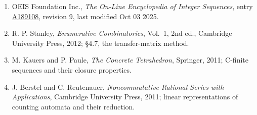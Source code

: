 \documentclass[11pt]{article}
\theoremstyle{definition}
\begin{document}
\begin{enumerate}

\item OEIS Foundation Inc., \emph{The On-Line Encyclopedia of Integer Sequences}, entry \href{https://oeis.org/A189108}{A189108}, revision 9, last modified Oct 03 2025.

\item R. P. Stanley, \emph{Enumerative Combinatorics}, Vol.~1, 2nd ed., Cambridge University Press, 2012; \S4.7, the transfer-matrix method.

\item M. Kauers and P. Paule, \emph{The Concrete Tetrahedron}, Springer, 2011; C-finite sequences and their closure properties.

\item J. Berstel and C. Reutenauer, \emph{Noncommutative Rational Series with Applications}, Cambridge University Press, 2011; linear representations of counting automata and their reduction.

\end{enumerate}
\end{document}
